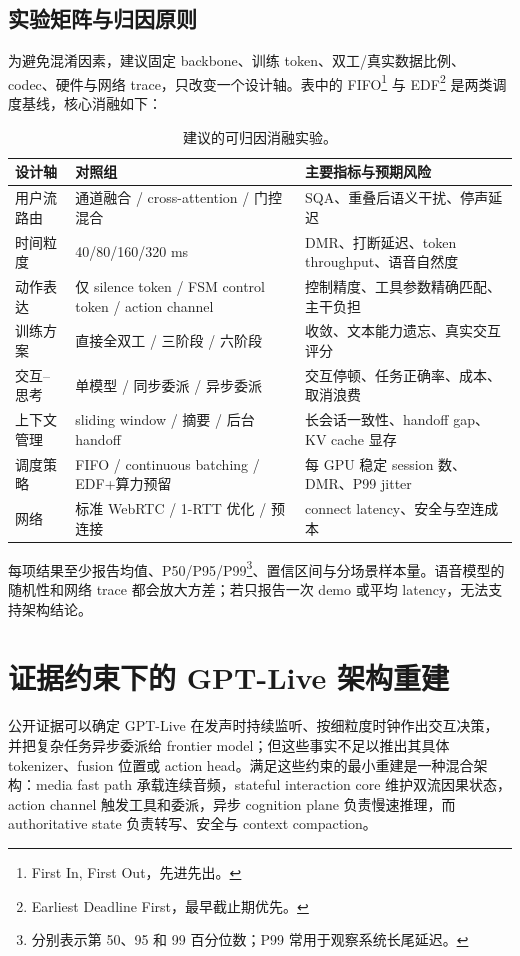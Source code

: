 \documentclass[UTF8,fontset=none,a4paper,10pt]{ctexart}
\begin{document}
\subsection{实验矩阵与归因原则}

为避免混淆因素，建议固定 backbone、训练 token、双工/真实数据比例、codec、硬件与网络 trace，只改变一个设计轴。表中的 FIFO\footnote{First In, First Out，先进先出。} 与 EDF\footnote{Earliest Deadline First，最早截止期优先。} 是两类调度基线，核心消融如下：

\begin{table}[H]
\centering\small
\caption{建议的可归因消融实验。}
\begin{tabularx}{\textwidth}{p{3.0cm}p{4.0cm}X}
\toprule
设计轴 & 对照组 & 主要指标与预期风险 \\
\midrule
用户流路由 & 通道融合 / cross-attention / 门控混合 & SQA、重叠后语义干扰、停声延迟 \\
时间粒度 & 40/80/160/320 ms & DMR、打断延迟、token throughput、语音自然度 \\
动作表达 & 仅 silence token / FSM control token / action channel & 控制精度、工具参数精确匹配、主干负担 \\
训练方案 & 直接全双工 / 三阶段 / 六阶段 & 收敛、文本能力遗忘、真实交互评分 \\
交互--思考 & 单模型 / 同步委派 / 异步委派 & 交互停顿、任务正确率、成本、取消浪费 \\
上下文管理 & sliding window / 摘要 / 后台 handoff & 长会话一致性、handoff gap、KV cache 显存 \\
调度策略 & FIFO / continuous batching / EDF+算力预留 & 每 GPU 稳定 session 数、DMR、P99 jitter \\
网络 & 标准 WebRTC / 1-RTT 优化 / 预连接 & connect latency、安全与空连成本 \\
\bottomrule
\end{tabularx}
\end{table}

每项结果至少报告均值、P50/P95/P99\footnote{分别表示第 50、95 和 99 百分位数；P99 常用于观察系统长尾延迟。}、置信区间与分场景样本量。语音模型的随机性和网络 trace 都会放大方差；若只报告一次 demo 或平均 latency，无法支持架构结论。

\section{证据约束下的 GPT-Live 架构重建}

公开证据可以确定 GPT-Live 在发声时持续监听、按细粒度时钟作出交互决策，并把复杂任务异步委派给 frontier model；但这些事实不足以推出其具体 tokenizer、fusion 位置或 action head。满足这些约束的最小重建是一种混合架构：media fast path 承载连续音频，stateful interaction core 维护双流因果状态，action channel 触发工具和委派，异步 cognition plane 负责慢速推理，而 authoritative state 负责转写、安全与 context compaction。
\end{document}
